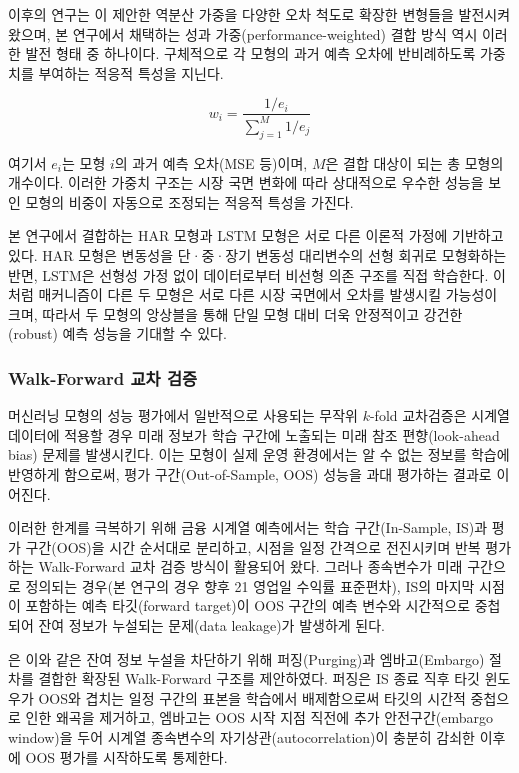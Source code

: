 \documentclass[eng]{kjas3}
\begin{document}
이후의 연구는 \citet{bates1969combination}이 제안한 역분산 가중을 다양한 오차 척도로 확장한 변형들을 발전시켜 왔으며\citep{timmermann2006forecast}, 본 연구에서 채택하는 성과 가중(performance-weighted) 결합 방식 역시 이러한 발전 형태 중 하나이다. 구체적으로 각 모형의 과거 예측 오차에 반비례하도록 가중치를 부여하는 적응적 특성을 지닌다.

\begin{equation}
w_i = \frac{1/e_i}{\sum_{j=1}^{M} 1/e_j}
\label{eq:perf_weight_general}
\end{equation}

여기서 $e_i$는 모형 $i$의 과거 예측 오차(MSE 등)이며, $M$은 결합 대상이 되는 총 모형의 개수이다. 이러한 가중치 구조는 시장 국면 변화에 따라 상대적으로 우수한 성능을 보인 모형의 비중이 자동으로 조정되는 적응적 특성을 가진다.

본 연구에서 결합하는 HAR 모형과 LSTM 모형은 서로 다른 이론적 가정에 기반하고 있다. HAR 모형은 변동성을 단·중·장기 변동성 대리변수의 선형 회귀로 모형화하는 반면, LSTM은 선형성 가정 없이 데이터로부터 비선형 의존 구조를 직접 학습한다. 이처럼 매커니즘이 다른 두 모형은 서로 다른 시장 국면에서 오차를 발생시킬 가능성이 크며, 따라서 두 모형의 앙상블을 통해 단일 모형 대비 더욱 안정적이고 강건한(robust) 예측 성능을 기대할 수 있다.

\subsubsection{Walk-Forward 교차 검증}
\label{subsubsec:walk_forward_review}

머신러닝 모형의 성능 평가에서 일반적으로 사용되는 무작위 $k$-fold 교차검증은 시계열 데이터에 적용할 경우 미래 정보가 학습 구간에 노출되는 미래 참조 편향(look-ahead bias) 문제를 발생시킨다. 이는 모형이 실제 운영 환경에서는 알 수 없는 정보를 학습에 반영하게 함으로써, 평가 구간(Out-of-Sample, OOS) 성능을 과대 평가하는 결과로 이어진다.

이러한 한계를 극복하기 위해 금융 시계열 예측에서는 학습 구간(In-Sample, IS)과 평가 구간(OOS)을 시간 순서대로 분리하고, 시점을 일정 간격으로 전진시키며 반복 평가하는 Walk-Forward 교차 검증 방식이 활용되어 왔다. 그러나 종속변수가 미래 구간으로 정의되는 경우(본 연구의 경우 향후 21 영업일 수익률 표준편차), IS의 마지막 시점이 포함하는 예측 타깃(forward target)이 OOS 구간의 예측 변수와 시간적으로 중첩되어 잔여 정보가 누설되는 문제(data leakage)가 발생하게 된다.

\citet{lopezdeprado2018}은 이와 같은 잔여 정보 누설을 차단하기 위해 퍼징(Purging)과 엠바고(Embargo) 절차를 결합한 확장된 Walk-Forward 구조를 제안하였다. 퍼징은 IS 종료 직후 타깃 윈도우가 OOS와 겹치는 일정 구간의 표본을 학습에서 배제함으로써 타깃의 시간적 중첩으로 인한 왜곡을 제거하고, 엠바고는 OOS 시작 지점 직전에 추가 안전구간(embargo window)을 두어 시계열 종속변수의 자기상관(autocorrelation)이 충분히 감쇠한 이후에 OOS 평가를 시작하도록 통제한다.
\end{document}
